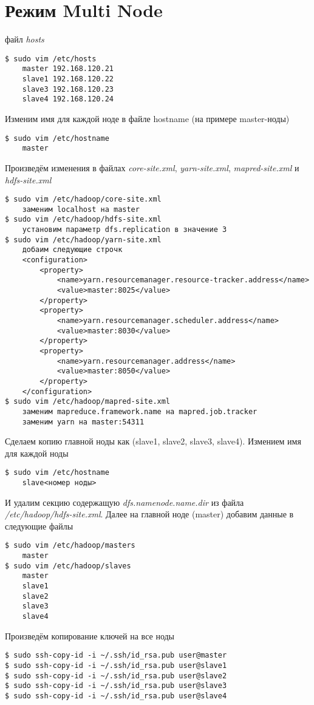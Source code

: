 \section{Режим Multi Node}
 файл \emph{hosts}
\begin{lstlisting}
$ sudo vim /etc/hosts
    master 192.168.120.21
    slave1 192.168.120.22
    slave3 192.168.120.23
    slave4 192.168.120.24
\end{lstlisting}
Изменим имя для каждой ноде в файле hostname (на примере master-ноды)
\begin{lstlisting}
$ sudo vim /etc/hostname
    master
\end{lstlisting}
Произведём изменения в файлах \emph{core-site.xml}, \emph{yarn-site.xml}, \emph{mapred-site.xml} и \\
\emph{hdfs-site.xml}
\begin{lstlisting}
$ sudo vim /etc/hadoop/core-site.xml
    заменим localhost на master
$ sudo vim /etc/hadoop/hdfs-site.xml
    установим параметр dfs.replication в значение 3
$ sudo vim /etc/hadoop/yarn-site.xml
    добаим следующие строчк
    <configuration>
        <property>
            <name>yarn.resourcemanager.resource-tracker.address</name>
            <value>master:8025</value>
        </property>
        <property>
            <name>yarn.resourcemanager.scheduler.address</name>
            <value>master:8030</value>
        </property>
        <property>
            <name>yarn.resourcemanager.address</name>
            <value>master:8050</value>
        </property>
    </configuration>
$ sudo vim /etc/hadoop/mapred-site.xml
    заменим mapreduce.framework.name на mapred.job.tracker
    заменим yarn на master:54311
\end{lstlisting}
Сделаем копию главной ноды как (slave1, slave2, slave3, slave4). Измением имя для каждой ноды
\begin{lstlisting}
$ sudo vim /etc/hostname
    slave<номер ноды>
\end{lstlisting}
И удалим секцию содержащую \emph{dfs.namenode.name.dir} из файла \emph{/etc/hadoop/hdfs-site.xml}. Далее на 
главной ноде (master) добавим данные в следующие файлы
\begin{lstlisting}
$ sudo vim /etc/hadoop/masters
    master
$ sudo vim /etc/hadoop/slaves
    master
    slave1
    slave2
    slave3
    slave4
\end{lstlisting}
Произведём копирование ключей на все ноды
\begin{lstlisting}
$ sudo ssh-copy-id -i ~/.ssh/id_rsa.pub user@master
$ sudo ssh-copy-id -i ~/.ssh/id_rsa.pub user@slave1
$ sudo ssh-copy-id -i ~/.ssh/id_rsa.pub user@slave2
$ sudo ssh-copy-id -i ~/.ssh/id_rsa.pub user@slave3
$ sudo ssh-copy-id -i ~/.ssh/id_rsa.pub user@slave4
\end{lstlisting}
